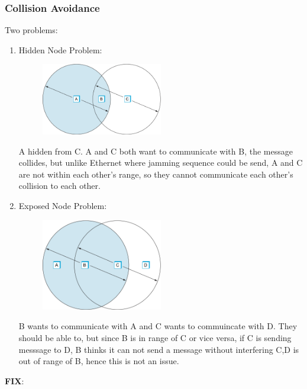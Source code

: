 \documentclass[11pt, a4paper]{article}
\begin{document}
\subsubsection{Collision Avoidance}
Two problems:
\begin{enumerate}
    \item Hidden Node Problem:
    \begin{figure}[H]
        \centering
        \includegraphics[width = 0.5\textwidth]{Pictures/hidden node.png}
        \label{fig:my_label}
    \end{figure}
    A hidden from C. A and C both want to communicate with B, the message collides, but unlike Ethernet where jamming sequence could be send, A and C are not within each other's range, so they cannot communicate each other's collision to each other.
    \item Exposed Node Problem:
    \begin{figure}[H]
        \centering
        \includegraphics[width = 0.5\textwidth]{Pictures/exposed node.png}
        \label{fig:my_label}
    \end{figure}
    B wants to communicate with A and C wants to commuincate with D. They should be able to, but since B is in range of C or vice versa, if C is sending messsage to D, B thinks it can not send a message without interfering C,D is out of range of B, hence this is not an issue.
\end{enumerate}
\textbf{FIX}: 
\end{document}
